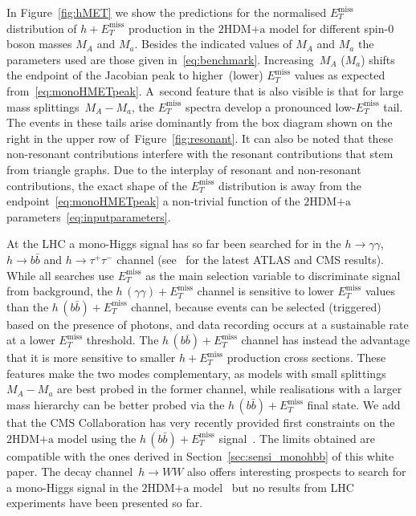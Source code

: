\documentclass[a4paper, 11pt,notoc]{article}
\newcommand{\MET}{\ensuremath{E_T^\mathrm{miss}}\xspace}
\newcommand{\mA}{\ensuremath{M_{A}}\xspace}
\newcommand{\ma}{\ensuremath{M_{a}}\xspace}
\newcommand{\hdma}{\ensuremath{\textrm{2HDM+a}}\xspace}
\begin{document}
In Figure~\ref{fig:hMET} we show the predictions for the normalised $\MET$ distribution of $h+\MET$ production in the \hdma model for different spin-0 boson masses $\mA$ and $\ma$. Besides the indicated values of $\mA$ and $\ma$ the parameters  used  are those given in~\eqref{eq:benchmark}. Increasing~$\mA$ ($\ma$) shifts the endpoint of the Jacobian peak to higher~(lower) $\MET$  values as expected from~\eqref{eq:monoHMETpeak}. A~second feature that is also visible is that for large mass splittings~$\mA - \ma$, the $\MET$ spectra develop a pronounced low-$\MET$ tail. The events in these tails arise dominantly from the box diagram shown on the right in the upper row of~Figure~\ref{fig:resonant}. It can also be noted that these non-resonant contributions interfere with the resonant contributions that stem from triangle graphs. Due to the interplay of resonant and non-resonant contributions,  the exact shape of the $\MET$ distribution is away from the endpoint~\eqref{eq:monoHMETpeak} a non-trivial function of the \hdma parameters~\eqref{eq:inputparameters}.  

 
  At the LHC a mono-Higgs signal has so far been searched for in the $h \to \gamma \gamma$, $h \to b \bar b$ and $h \to \tau^+ \tau^-$ channel (see~\cite{Aaboud:2017uak,ATLAS-CONF-2018-039,CMS-PAS-EXO-16-050,CMS:2018yme}  for the latest ATLAS and CMS results).  While all searches use $\MET$ as the main selection variable to discriminate signal from background,  the  $h \, (\gamma \gamma) + \MET$  channel  is sensitive to lower $\MET$ values than the $h \, (b \bar b) + \MET$  channel, because events can be selected (triggered) based on the presence of photons, and data recording occurs at a sustainable rate at a lower $\MET$ threshold. The $h \, (b \bar b) + \MET$  channel has instead the advantage that it is more sensitive to smaller $h + \MET$ production cross sections. These features make the two modes complementary, as models with  small  splittings $\mA - \ma$ are best probed in the former channel, while realisations with a larger mass hierarchy can be better probed via the $h \, (b \bar b) + \MET$ final state. We add that the CMS Collaboration has very recently provided first constraints on the \hdma model using the $h \, (b \bar b) + \MET$ signal~\cite{CMS-PAS-EXO-16-050}. The limits obtained are compatible with the ones derived in Section~\ref{sec:sensi_monohbb} of this white paper. The decay channel~$h \to WW$ also offers interesting prospects to search for a mono-Higgs signal in the \hdma model~\cite{GPHeidelberg} but no results from LHC experiments have been presented so far.
\end{document}
